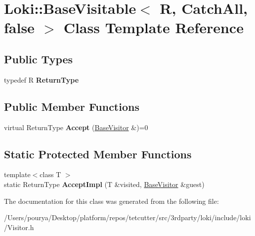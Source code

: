 \hypertarget{classLoki_1_1BaseVisitable_3_01R_00_01CatchAll_00_01false_01_4}{}\section{Loki\+:\+:Base\+Visitable$<$ R, Catch\+All, false $>$ Class Template Reference}
\label{classLoki_1_1BaseVisitable_3_01R_00_01CatchAll_00_01false_01_4}
\subsection*{Public Types}
\begin{DoxyCompactItemize}
\item 
\hypertarget{classLoki_1_1BaseVisitable_3_01R_00_01CatchAll_00_01false_01_4_a97884e5a3344d764d61aebe8c588cbfd}{}typedef R {\bfseries Return\+Type}\label{classLoki_1_1BaseVisitable_3_01R_00_01CatchAll_00_01false_01_4_a97884e5a3344d764d61aebe8c588cbfd}

\end{DoxyCompactItemize}
\subsection*{Public Member Functions}
\begin{DoxyCompactItemize}
\item 
\hypertarget{classLoki_1_1BaseVisitable_3_01R_00_01CatchAll_00_01false_01_4_a1db27f35ca97dc2b3cabeac7ff271333}{}virtual Return\+Type {\bfseries Accept} (\hyperlink{classLoki_1_1BaseVisitor}{Base\+Visitor} \&)=0\label{classLoki_1_1BaseVisitable_3_01R_00_01CatchAll_00_01false_01_4_a1db27f35ca97dc2b3cabeac7ff271333}

\end{DoxyCompactItemize}
\subsection*{Static Protected Member Functions}
\begin{DoxyCompactItemize}
\item 
\hypertarget{classLoki_1_1BaseVisitable_3_01R_00_01CatchAll_00_01false_01_4_a45e441f97955f699cca7173c79392a88}{}{\footnotesize template$<$class T $>$ }\\static Return\+Type {\bfseries Accept\+Impl} (T \&visited, \hyperlink{classLoki_1_1BaseVisitor}{Base\+Visitor} \&guest)\label{classLoki_1_1BaseVisitable_3_01R_00_01CatchAll_00_01false_01_4_a45e441f97955f699cca7173c79392a88}

\end{DoxyCompactItemize}


The documentation for this class was generated from the following file\+:\begin{DoxyCompactItemize}
\item 
/\+Users/pourya/\+Desktop/platform/repos/tetcutter/src/3rdparty/loki/include/loki/Visitor.\+h\end{DoxyCompactItemize}
